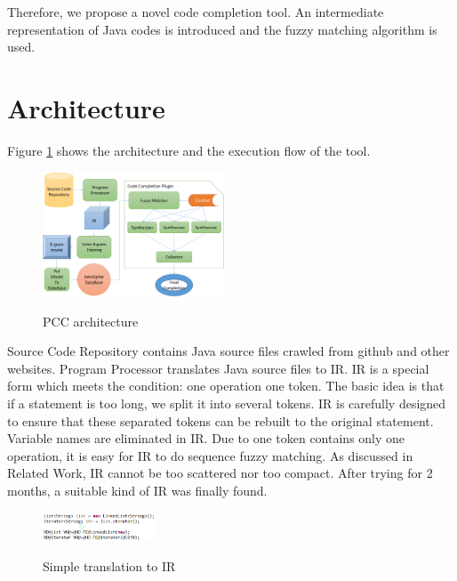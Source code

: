 \documentclass{sig-alternate-05-2015}
\begin{document}
Therefore, we propose a novel code completion tool. An intermediate representation of Java codes is introduced and the fuzzy matching algorithm is used.

\section{Architecture}

Figure \ref{architecture} shows the architecture and the execution flow of the tool.
\vspace{-0.25cm}
\\\begin{figure}[htbp]
  \centering
  \includegraphics[width=0.48\textwidth]{pics/architecture.png}\\
  \caption{PCC architecture}\label{architecture}
\end{figure}

Source Code Repository contains Java source files crawled from github and other websites. Program Processor translates Java source files to IR. IR is a special form which meets the condition: one operation one token. The basic idea is that if a statement is too long, we split it into several tokens. IR is carefully designed to ensure that these separated tokens can be rebuilt to the original statement. Variable names are eliminated in IR. Due to one token contains only one operation, it is easy for IR to do sequence fuzzy matching. As discussed in Related Work, IR cannot be too scattered nor too compact. After trying for 2 months, a suitable kind of IR was finally found.
\vspace{-0.25cm}
\\\begin{figure}[htbp]
  \centering
  \includegraphics[width=0.3\textwidth]{pics/toIR1.png}\\
  \vspace{-0.15cm}
  \caption{Simple translation to IR}\label{toIR1}
\end{figure}
\end{document}
